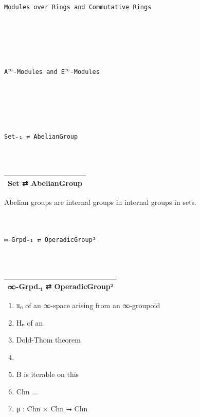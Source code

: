 \documentclass{book}
\theoremstyle{definition}
\renewcommand{\chapter}[1]{
\newpage
{
\Huge 
\begin{center}
\ \\
\ \\
\thispagestyle{empty}
\texttt{#1}
\end{center}}
\ \\
\ \\
}
\begin{document}

\newpage
\chapter{Modules over Rings and Commutative Rings}




\newpage
\chapter{A${}^{\infty}$-Modules and E${}^{\infty}$-Modules}




\newpage
\chapter{Set₋₁ ⇄ AbelianGroup}

{
\footnotesize
\begin{center}
\begin{tabular}{||l ||} 
 \hline
Set ⇄ AbelianGroup \\
 \hline
\end{tabular}
\end{center}
}

Abelian groups are internal groups in internal groups in sets.\\



\newpage
\chapter{∞-Grpd₋₁ ⇄ OperadicGroup²}


{
\footnotesize
\begin{center}
\begin{tabular}{|| l ||} 
 \hline
∞-Grpd₋₁ ⇄ OperadicGroup² \\
 \hline
\end{tabular}
\end{center}
}

\begin{enumerate}
\item πₙ of an ∞-space arising from an ∞-groupoid
\item Hₙ of an 
\item Dold-Thom theorem
\item 
\item B is iterable on this
\item Chn ... 
\item μ : Chn × Chn ⭢ Chn
\end{enumerate}
\end{document}
